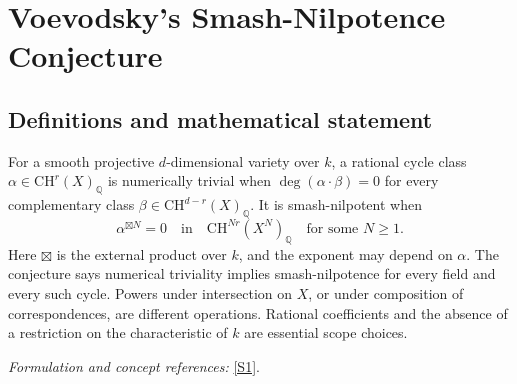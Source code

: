 \documentclass[11pt,a4paper]{article}
\newcommand{\Q}{\mathbb{Q}}
\newcommand{\sref}[2]{\hyperlink{source:#1:#2}{[S#2]}}
\newif\ifshowcatalogue
\newcommand{\cataloguescope}[1]{\ifshowcatalogue
 \paragraph{Exact scope in the supplied catalogue.}
 \begin{quote}\small #1\end{quote}\fi}
\numberwithin{equation}{section}
\begin{document}
\setcounter{section}{0}
\clearpage
\section*{\texorpdfstring{Voevodsky's Smash-Nilpotence Conjecture}{Voevodsky's Smash-Nilpotence Conjecture}}\label{statement}
\subsection{Definitions and mathematical statement}
For a smooth projective $d$-dimensional variety over $k$, a rational cycle class $\alpha\in\mathrm{CH}^r(X)_{\Q}$ is numerically trivial when
$\deg(\alpha\cdot\beta)=0$ for every complementary class $\beta\in\mathrm{CH}^{d-r}(X)_{\Q}$. It is smash-nilpotent when
\[
 \alpha^{\boxtimes N}=0\quad\text{in}\quad\mathrm{CH}^{Nr}(X^N)_{\Q}
 \quad\text{for some }N\ge1.
\]
Here $\boxtimes$ is the external product over $k$, and the exponent may depend on $\alpha$. The conjecture says numerical triviality implies smash-nilpotence for every field and every such cycle. Powers under intersection on $X$, or under composition of correspondences, are different operations. Rational coefficients and the absence of a restriction on the characteristic of $k$ are essential scope choices.
\par\smallskip\textit{Formulation and concept references:} \sref{statement}{1}.
\cataloguescope{For every field k, every smooth projective k-variety X of dimension d, every integer 0<=r<=d, and every class alpha in CH\textasciicircum{}r(X)\_Q (codimension-r cycles modulo rational equivalence with rational coefficients), assume deg(alpha.beta)=0 for every beta in CH\textasciicircum{}(d-r)(X)\_Q. Voevodsky's smash-nilpotence assertion is that there exists an integer N>=1, depending on alpha, for which the N-fold EXTERNAL product alpha times ... times alpha is zero in CH\textasciicircum{}(Nr)(X\textasciicircum{}N)\_Q, where X\textasciicircum{}N is the fibre product over k. No algebraic-closure, characteristic-zero or geometric-connectedness hypothesis is imposed; disconnected smooth projective schemes are interpreted on their pure-dimensional components. The reverse implication, smash-nilpotent implies numerically trivial, is known, so this is equality of numerical and smash equivalence for rational cycles. Neither intersection powers on X, composition powers of correspondences, integral coefficients, nor a uniform or computable exponent replaces this assertion.}
\end{document}

